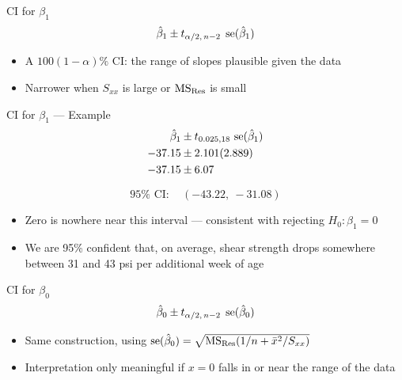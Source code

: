 \begin{frame}{CI for $\beta_1$}
	\[
		\hat\beta_1 \pm t_{\alpha/2,\,n-2}\; \operatorname{se}(\hat\beta_1)
	\]
	
	\begin{itemize}
		\item A $100(1-\alpha)\%$ CI: the range of slopes plausible given the data
		\item Narrower when $S_{xx}$ is large or $\mathrm{MS}_{\mathrm{Res}}$ is small
	\end{itemize}
\end{frame}


\begin{frame}{CI for $\beta_1$ --- Example}
	\begin{align*}
		\hat\beta_1 &\pm t_{0.025,18}\,\operatorname{se}(\hat\beta_1)\\
		-37.15 &\pm 2.101(2.889)\\
		-37.15 &\pm 6.07
	\end{align*}

	\[
		95\%\text{ CI}: \quad (-43.22,\ -31.08)
	\]

	\begin{itemize}
		\item Zero is nowhere near this interval --- consistent with rejecting $H_0:\beta_1=0$
		\item We are 95\% confident that, on average, shear strength drops somewhere between 31 and 43 psi per additional week of age
	\end{itemize}
\end{frame}


\begin{frame}{CI for $\beta_0$}
	\[
		\hat\beta_0 \pm t_{\alpha/2,\,n-2}\; \operatorname{se}(\hat\beta_0)
	\]

	\begin{itemize}
		\item Same construction, using $\operatorname{se}(\hat\beta_0)=\sqrt{\mathrm{MS}_{\mathrm{Res}}(1/n+\bar x^2/S_{xx})}$
		\item Interpretation only meaningful if $x=0$ falls in or near the range of the data
	\end{itemize}
\end{frame}


